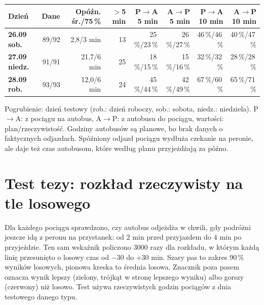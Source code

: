 \documentclass[10pt,a4paper]{article}
\newcommand{\mut}[1]{\textcolor{muted}{#1}}
\begin{document}
{\footnotesize
\begin{center}\begin{tabular}{@{}l r r r r r r r@{}}\toprule
Dzień & Dane & Opóźn. śr./75\,\% & $>$5 min & P$\to$A 5 min & A$\to$P 5 min & P$\to$A 10 min & A$\to$P 10 min \\ \midrule
\textbf{26.09 sob.} & 89/92 & 2,8/3 min & 13 & 25\,\%/23\,\% & 26\,\%/27\,\% & 46\,\%/46\,\% & 40\,\%/47\,\% \\
\textbf{27.09 niedz.} & 91/91 & 21,7/6 min & 25 & 18\,\%/15\,\% & 15\,\%/16\,\% & 32\,\%/32\,\% & 28\,\%/28\,\% \\
\textbf{28.09 rob.} & 93/93 & 12,0/6 min & 24 & 45\,\%/44\,\% & 42\,\%/49\,\% & 67\,\%/60\,\% & 65\,\%/71\,\% \\
\bottomrule\end{tabular}\end{center}}
\mut{\footnotesize Pogrubienie: dzień testowy (rob.: dzień roboczy, sob.: sobota, niedz.: niedziela). P$\to$A: z pociągu na autobus, A$\to$P: z autobusu do pociągu, wartości: plan/rzeczywistość. Godziny autobusów są planowe, bo brak danych o faktycznych odjazdach. Spóźniony odjazd pociągu wydłuża czekanie na peronie, ale daje też czas autobusom, które według planu przyjeżdżają za późno.}
\section{Test tezy: rozkład rzeczywisty na tle losowego}
Dla każdego pociągu sprawdzono, czy autobus odjeżdża w chwili, gdy podróżni jeszcze idą z peronu na przystanek: od 2 min przed przyjazdem do 4 min po przyjeździe. Ten sam wskaźnik policzono 3000 razy dla rozkładu, w którym każdą linię przesunięto o losowy czas od $-30$ do $+30$ min. Szary pas to zakres 90\,\% wyników losowych, pionowa kreska to średnia losowa. Znacznik poza pasem oznacza wynik lepszy (zielony, trójkąt w stronę lepszego wyniku) albo gorszy (czerwony) niż losowo. Test używa rzeczywistych godzin pociągów z dnia testowego danego typu.
\end{document}
